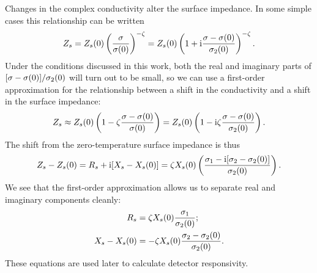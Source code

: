 Changes in the complex conductivity alter the surface impedance. In some simple cases this relationship can be written~\autocite{Zmuidzinas2012ARCMP}
\begin{equation}
Z_s
  =
  Z_s(0) \left(\frac{\sigma}{\sigma(0)}\right)^{-\zeta}
  =
  Z_s(0)
  \left( 1 + \mathrm{i} \frac{\sigma - \sigma(0)}{\sigma_2(0)} \right)^{-\zeta}.
\label{eqn:surface_impedance.response}
\end{equation}
Under the conditions discussed in this work, both the real and imaginary parts of $[\sigma - \sigma(0)] / \sigma_2(0)$ will turn out to be small, so we can use a first-order approximation for the relationship between a shift in the conductivity and a shift in the surface impedance:
\begin{equation}
Z_s
  \approx
  Z_s(0) \left( 1 - \zeta \frac{\sigma - \sigma(0)}{\sigma(0)} \right)
  =
  Z_s(0) \left( 1 - \mathrm{i} \zeta \frac{\sigma - \sigma(0)}{\sigma_2(0)} \right).
\end{equation}
The shift from the zero-temperature surface impedance is thus
\begin{equation}
Z_s - Z_s(0)
  =
  R_s + \mathrm{i} [X_s - X_s(0)]
  =
  \zeta X_s(0)
  \left( \frac{\sigma_1 - \mathrm{i} [\sigma_2 - \sigma_2(0)]}{\sigma_2(0)} \right).
\label{eqn:impedance_surface_first_order}
\end{equation}
We see that the first-order approximation allows us to separate real and imaginary components cleanly:
\begin{align}
\begin{split}
R_s
  &=
  \zeta X_s(0) \frac{\sigma_1}{\sigma_2(0)}; \\
X_s - X_s(0)
  &=
  -\zeta X_s(0) \frac{\sigma_2 - \sigma_2(0)}{\sigma_2(0)}.
\end{split}
\label{eqn:surface_resistance_and_reactance_shift}
\end{align}
These equations are used later to calculate detector responsivity.

